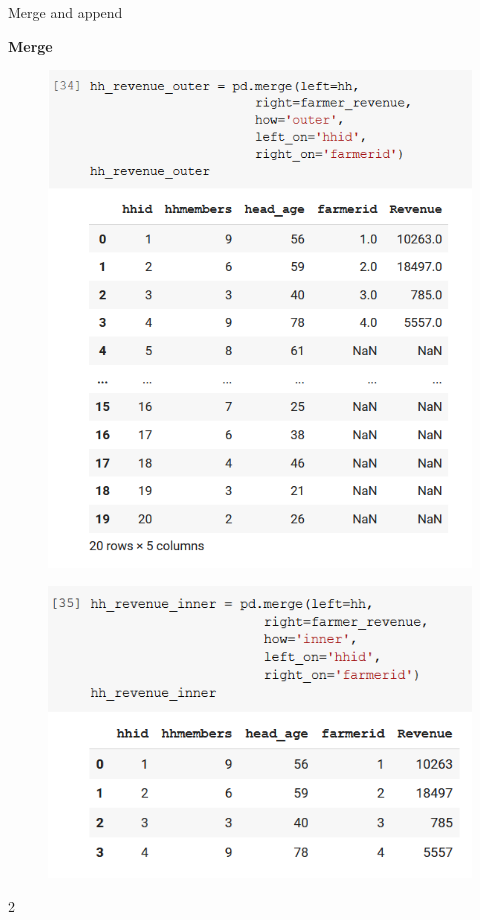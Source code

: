 \documentclass[aspectratio=169]{beamer}
\begin{document}
\begin{frame}{Merge and append}

	\textbf{Merge}

	\begin{multicols}{2}

		\begin{figure}
			\centering
			\includegraphics[width=0.85\linewidth]{img/outer_merge.png}
		\end{figure}
		\begin{figure}
			\centering
			\includegraphics[width=0.85\linewidth]{img/inner_merge.png}
		\end{figure}

	\end{multicols}{2}

\end{frame}
\end{document}
